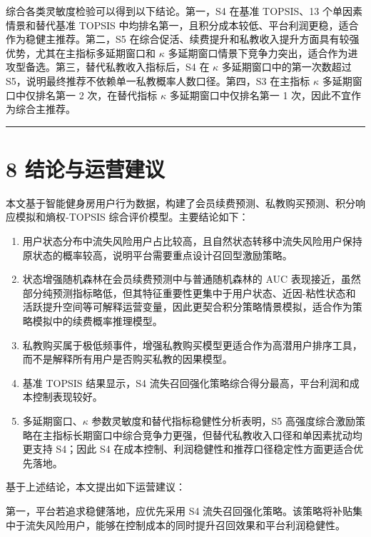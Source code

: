 \documentclass[
  12pt,
]{ctexart}
\providecommand{\tightlist}{%
  \setlength{\itemsep}{0pt}\setlength{\parskip}{0pt}}
\begin{document}
综合各类灵敏度检验可以得到以下结论。第一，S4 在基准 TOPSIS、13 个单因素情景和替代基准 TOPSIS 中均排名第一，且积分成本较低、平台利润更稳，适合作为稳健主推荐。第二，S5 在综合促活、续费提升和私教收入提升方面具有较强优势，尤其在主指标多延期窗口和 \(\kappa\) 多延期窗口情景下竞争力突出，适合作为进攻型备选。第三，替代私教收入指标后，S4 在 \(\kappa\) 多延期窗口中的第一次数超过 S5，说明最终推荐不依赖单一私教概率人数口径。第四，S3 在主指标 \(\kappa\) 多延期窗口中仅排名第一 2 次，在替代指标 \(\kappa\) 多延期窗口中仅排名第一 1 次，因此不宜作为综合主推荐。

\begin{center}\rule{0.5\linewidth}{0.5pt}\end{center}

\hypertarget{ux7ed3ux8bbaux4e0eux8fd0ux8425ux5efaux8bae}{%
\section{8 结论与运营建议}\label{ux7ed3ux8bbaux4e0eux8fd0ux8425ux5efaux8bae}}

本文基于智能健身房用户行为数据，构建了会员续费预测、私教购买预测、积分响应模拟和熵权-TOPSIS 综合评价模型。主要结论如下：

\begin{enumerate}
\def\labelenumi{\arabic{enumi}.}
\tightlist
\item
  用户状态分布中流失风险用户占比较高，且自然状态转移中流失风险用户保持原状态的概率较高，说明平台需要重点设计召回型激励策略。
\item
  状态增强随机森林在会员续费预测中与普通随机森林的 AUC 表现接近，虽然部分纯预测指标略低，但其特征重要性更集中于用户状态、近因-粘性状态和活跃提升空间等可解释运营变量，因此更契合积分策略情景模拟，适合作为策略模拟中的续费概率推理模型。
\item
  私教购买属于极低频事件，增强私教购买模型更适合作为高潜用户排序工具，而不是解释所有用户是否购买私教的因果模型。
\item
  基准 TOPSIS 结果显示，S4 流失召回强化策略综合得分最高，平台利润和成本控制表现较好。
\item
  多延期窗口、\(\kappa\) 参数灵敏度和替代指标稳健性分析表明，S5 高强度综合激励策略在主指标长期窗口中综合竞争力更强，但替代私教收入口径和单因素扰动均更支持 S4；因此 S4 在成本控制、利润稳健性和推荐口径稳定性方面更适合优先落地。
\end{enumerate}

基于上述结论，本文提出如下运营建议：

第一，平台若追求稳健落地，应优先采用 S4 流失召回强化策略。该策略将补贴集中于流失风险用户，能够在控制成本的同时提升召回效果和平台利润稳健性。
\end{document}
